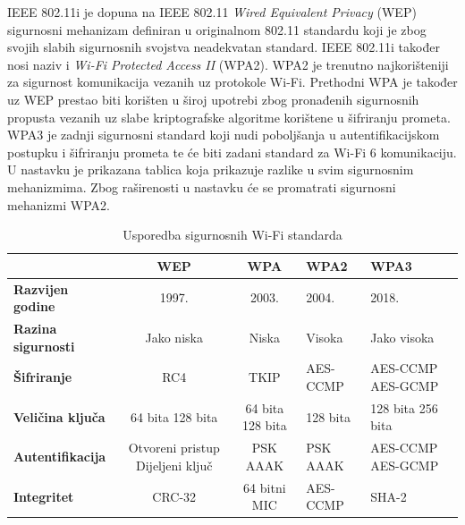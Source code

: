 \documentclass[times, utf8, diplomski]{fer}
\begin{document}
IEEE 802.11i je dopuna na IEEE 802.11 \emph{Wired Equivalent Privacy} (WEP) sigurnosni mehanizam definiran u originalnom 802.11 standardu koji je zbog svojih slabih sigurnosnih svojstva neadekvatan standard. IEEE 802.11i također nosi naziv i \emph{Wi-Fi Protected Access II} (WPA2). WPA2 je trenutno najkorišteniji za sigurnost komunikacija vezanih uz protokole Wi-Fi. Prethodni WPA je također uz WEP prestao biti korišten u široj upotrebi zbog pronađenih sigurnosnih propusta vezanih uz slabe kriptografske algoritme korištene u šifriranju prometa. WPA3 je zadnji sigurnosni standard koji nudi poboljšanja u autentifikacijskom postupku i šifriranju prometa te će biti zadani standard za Wi-Fi 6 komunikaciju. U nastavku je prikazana tablica koja prikazuje razlike u svim sigurnosnim mehanizmima. Zbog raširenosti u nastavku će se promatrati sigurnosni mehanizmi WPA2.
\begin{table}[H]
    \centering
    \caption{Usporedba sigurnosnih Wi-Fi standarda}
    \begin{tabular}{| M || S | S | X | X |} 
    \hline
                              & \textbf{WEP} & \textbf{WPA} & \textbf{WPA2} & \textbf{WPA3}\\
    \hline\hline
    \textbf{Razvijen godine}         & 1997. & 2003. & 2004. & 2018.\\
    \hline
    \textbf{Razina sigurnosti}& Jako niska & Niska & Visoka & Jako visoka\\ 
    \hline
    \textbf{{Šifriranje}}     &  RC4 & TKIP & AES-CCMP & AES-CCMP AES-GCMP\\ 
    \hline
    \textbf{Veličina ključa}  & 64 bita \hspace{0.2cm}128 bita & 64 bita\hspace{0.2cm} 128 bita &  128 bita & 128 bita \hspace{1cm}256 bita\\ 
    \hline
    \textbf{Autentifikacija}  & Otvoreni pristup Dijeljeni ključ & PSK AAAK & PSK \hspace{1cm}AAAK & AES-CCMP AES-GCMP\\ 
    \hline
    \textbf{Integritet}       & CRC-32 & 64 bitni MIC & AES-CCMP & SHA-2\\ 
    \hline
    \end{tabular}
    \label{tab:wpa}
\end{table}
\end{document}
